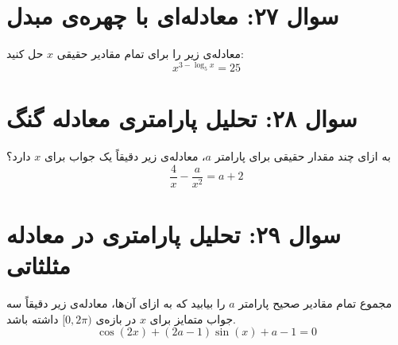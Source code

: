 \documentclass[12pt]{article}
\begin{document}
	\vspace{1cm}
	\hrulefill
	\vspace{1cm}
	
	\section*{سوال ۲۷: معادله‌ای با چهره‌ی مبدل}
	معادله‌ی زیر را برای تمام مقادیر حقیقی \(x\) حل کنید:
	\begin{displaymath}
		x^{3 - \log_{5}x} = 25
	\end{displaymath}
	
	\vspace{1cm}
	\hrulefill
	\vspace{1cm}
	
	\section*{سوال ۲۸: تحلیل پارامتری معادله گنگ}
	به ازای چند مقدار حقیقی برای پارامتر \(a\)، معادله‌ی زیر دقیقاً یک جواب برای \(x\) دارد؟
	\begin{displaymath}
		\frac{4}{x} - \frac{a}{x^2} = a + 2
	\end{displaymath}
	
	\vspace{1cm}
	\hrulefill
	\vspace{1cm}
	
	\section*{سوال ۲۹: تحلیل پارامتری در معادله مثلثاتی}
	مجموع تمام مقادیر صحیح پارامتر \(a\) را بیابید که به ازای آن‌ها، معادله‌ی زیر دقیقاً سه جواب متمایز برای \(x\) در بازه‌ی \( [0, 2\pi) \) داشته باشد.
	\begin{displaymath}
		\cos(2x) + (2a-1)\sin(x) + a - 1 = 0
	\end{displaymath}
	
	\vspace{1cm}
	\hrulefill
	\vspace{1cm}
	
\end{document}
